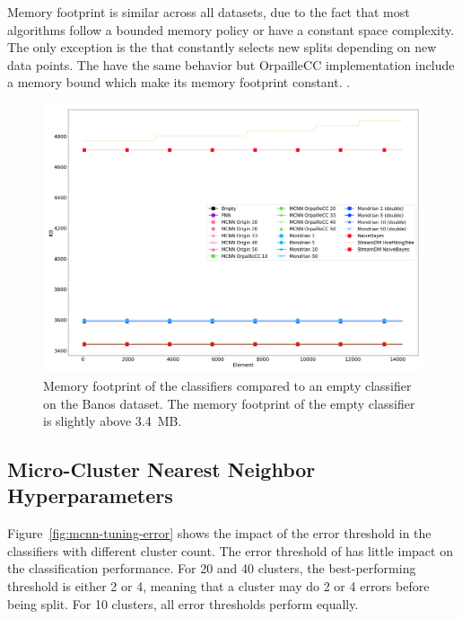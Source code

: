 Memory footprint is similar across all datasets, due to the fact that most
algorithms follow a bounded memory policy or have a constant space complexity.
The only exception is the \hoeffdingtree that constantly selects new splits
depending on new data points. The \mondrianforest have the same behavior but
OrpailleCC implementation include a memory bound which make its memory
footprint constant.
.

\begin{figure}
	\includegraphics[width=\linewidth]{figures/results/banos_3_memory.png}
	\caption{Memory footprint of the classifiers compared to an empty
	classifier on the Banos dataset. The memory footprint of the empty
	classifier is slightly above 3.4~MB.}
	\label{fig:memory}
\end{figure}


\subsection{Micro-Cluster Nearest Neighbor Hyperparameters}

Figure~\ref{fig:mcnn-tuning-error} shows the impact of the error threshold
in the \mcnn classifiers with different cluster count. The error
threshold of \mcnn has little impact on the classification performance. For
20 and 40 clusters, the best-performing threshold is either 2 or 4, meaning
that a cluster may do 2 or 4 errors before being split. For 10 clusters,
all error thresholds perform equally.

